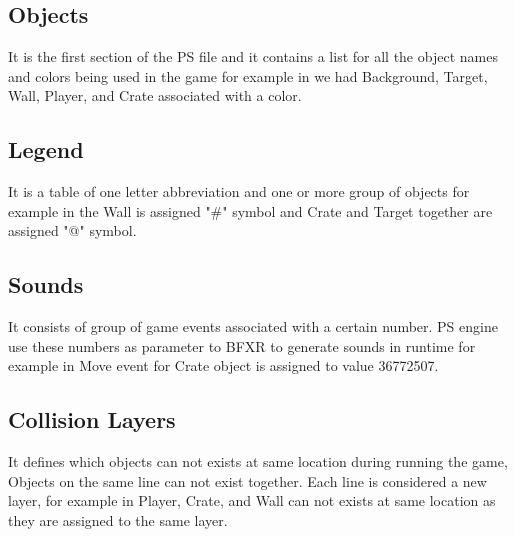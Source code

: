 \subsection{Objects}
It is the first section of the PS file and it contains a list for all the object names and colors being used in the game for example in  we had Background, Target, Wall, Player, and Crate associated with a color.
\subsection{Legend}
It is a table of one letter abbreviation and one or more group of objects for example in  the Wall is assigned "\#" symbol and Crate and Target together are assigned "@" symbol.
\subsection{Sounds}
It consists of group of game events associated with a certain number. PS engine use these numbers as parameter to BFXR to generate sounds in runtime\cite{bfxr} for example in  Move event for Crate object is assigned to value 36772507.
\subsection{Collision Layers}
It defines which objects can not exists at same location during running the game, Objects on the same line can not exist together. Each line is considered a new layer, for example in  Player, Crate, and Wall can not exists at same location as they are assigned to the same layer.
